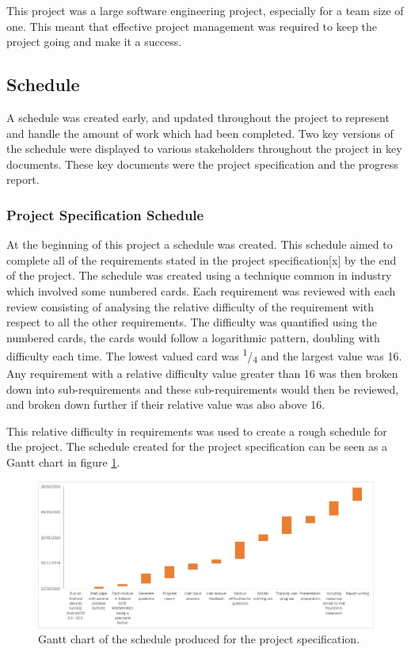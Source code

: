 \documentclass{article}
\begin{document}
This project was a large software engineering project, especially for a team size of one. This meant that effective project management was required to keep the project going and make it a success. 

\subsection{Schedule}

A schedule was created early, and updated throughout the project to represent and handle the amount of work which had been completed. Two key versions of the schedule were displayed to various stakeholders throughout the project in key documents. These key documents were the project specification and the progress report. 

\subsubsection{Project Specification Schedule}

At the beginning of this project a schedule was created. This schedule aimed to complete all of the requirements stated in the project specification[x] by the end of the project. The schedule was created using a technique common in industry which involved some numbered cards. Each requirement was reviewed with each review consisting of analysing the relative difficulty of the requirement with respect to all the other requirements. The difficulty was quantified using the numbered cards, the cards would follow a logarithmic pattern, doubling with difficulty each time. The lowest valued card was \textsuperscript{1}/\textsubscript{4} and the largest value was 16. Any requirement with a relative difficulty value greater than 16 was then broken down into sub-requirements and these sub-requirements would then be reviewed, and broken down further if their relative value was also above 16. \par

This relative difficulty in requirements was used to create a rough schedule for the project. The schedule created for the project specification can be seen as a Gantt chart in figure \ref{figure:projectSpecGanttChart}. \par

\begin{figure}[H]
	\centering
	\includegraphics[width=\linewidth]{./data/projectSpecGanttChart.png}
	\caption{Gantt chart of the schedule produced for the project specification.}
	\label{figure:projectSpecGanttChart}
\end{figure}
\end{document}
